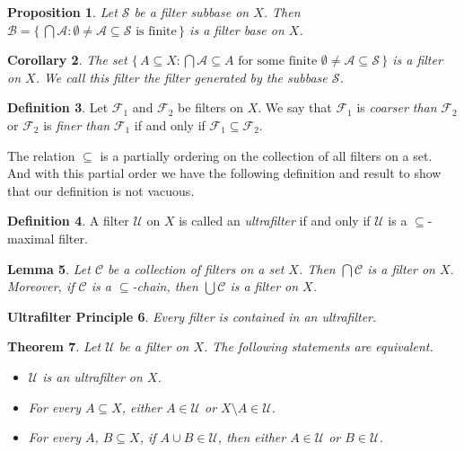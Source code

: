 \documentclass[12pt]{article}
\theoremstyle{plain}
\newtheorem{thm}{Theorem}[section]
\newtheorem{lem}[thm]{Lemma}
\newtheorem{prop}[thm]{Proposition}
\newtheorem{cor}[thm]{Corollary}
\newtheorem{up}[thm]{Ultrafilter Principle}
\theoremstyle{definition}
\newtheorem{defn}[thm]{Definition}
\newcommand{\calA}{\mathcal{A}}
\newcommand{\calB}{\mathcal{B}}
\newcommand{\calC}{\mathcal{C}}
\newcommand{\calF}{\mathcal{F}}
\newcommand{\calS}{\mathcal{S}}
\newcommand{\calU}{\mathcal{U}}
\begin{document}
\begin{prop}
  Let $\calS$ be a filter subbase on $X$.
  Then $\calB = \{\, \bigcap \calA : \mbox{$\emptyset \ne \calA
    \subseteq \calS$ is finite} \,\}$ is a filter base on $X$.
\end{prop}

\begin{cor}
  The set $\{\, A \subseteq X : \mbox{$\bigcap\calA \subseteq A$ for
    some finite $\emptyset \ne \calA \subseteq \calS$} \,\}$ is a
  filter on $X$.
  We call this filter the \textsl{filter generated by the subbase $\calS$}.
\end{cor}

\begin{defn}
  Let $\calF_1$ and $\calF_2$ be filters on $X$.
  We say that $\calF_1$ is \textsl{coarser than} $\calF_2$ or
  $\calF_2$ is \textsl{finer than} $\calF_1$ if and only if $\calF_1
  \subseteq \calF_2$. 
\end{defn}

The relation $\subseteq$ is a partially ordering on the collection of
all filters on a set. 
And with this partial order we have the following definition and
result to show that our definition is not vacuous. 

\begin{defn}
  A filter $\calU$ on $X$ is called an \textsl{ultrafilter} if and
  only if $\calU$ is a \mbox{$\subseteq$-maximal} filter.
\end{defn}

\begin{lem}
  Let $\calC$ be a collection of filters on a set $X$.
  Then $\bigcap\calC$ is a filter on $X$.
  Moreover, if $\calC$ is a \mbox{$\subseteq$-chain}, then
  $\bigcup\calC$ is a filter on $X$.
\end{lem}

\begin{up}
  Every filter is contained in an ultrafilter. 
\end{up}

\begin{thm}
  Let $\calU$ be a filter on $X$.
  The following statements are equivalent.
  \begin{itemize}
    \item[(a)] $\calU$ is an ultrafilter on $X$.
    \item[(b)] For every $A \subseteq X$, either $A \in \calU$ or $X
      \setminus A \in \calU$.
    \item[(c)] For every $A$, $B \subseteq X$, if $A \cup B \in
      \calU$, then either $A \in \calU$ or $B \in \calU$.
  \end{itemize}
\end{thm}
\end{document}
